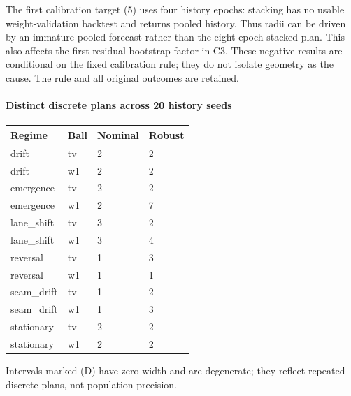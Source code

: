 The first calibration target (5) uses four history epochs: stacking has no usable weight-validation backtest and returns pooled history. Thus radii can be driven by an immature pooled forecast rather than the eight-epoch stacked plan. This also affects the first residual-bootstrap factor in C3. These negative results are conditional on the fixed calibration rule; they do not isolate geometry as the cause. The rule and all original outcomes are retained.

\clearpage

\paragraph{Distinct discrete plans across 20 history seeds}
\begin{center}\small\begin{tabular}{llll}
\toprule
Regime & Ball & Nominal & Robust\\\midrule
drift & tv & 2 & 2\\
drift & w1 & 2 & 2\\
emergence & tv & 2 & 2\\
emergence & w1 & 2 & 7\\
lane\_shift & tv & 3 & 2\\
lane\_shift & w1 & 3 & 4\\
reversal & tv & 1 & 3\\
reversal & w1 & 1 & 1\\
seam\_drift & tv & 1 & 2\\
seam\_drift & w1 & 1 & 3\\
stationary & tv & 2 & 2\\
stationary & w1 & 2 & 2\\
\bottomrule\end{tabular}\end{center}

Intervals marked (D) have zero width and are degenerate; they reflect repeated discrete plans, not population precision.

